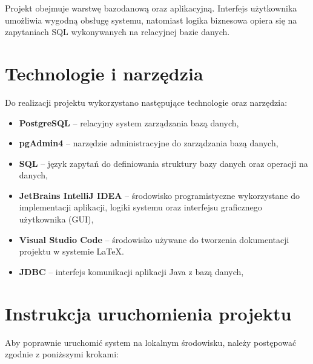 Projekt obejmuje warstwę bazodanową oraz aplikacyjną.
Interfejs użytkownika umożliwia wygodną obsługę systemu,
natomiast logika biznesowa opiera się na zapytaniach SQL
wykonywanych na relacyjnej bazie danych.


\section{Technologie i narzędzia}

Do realizacji projektu wykorzystano następujące technologie oraz narzędzia:
\begin{itemize}
    \item \textbf{PostgreSQL} – relacyjny system zarządzania bazą danych,
    \item \textbf{pgAdmin4} – narzędzie administracyjne do zarządzania bazą danych,
    \item \textbf{SQL} – język zapytań do definiowania struktury bazy danych
    oraz operacji na danych,
    \item \textbf{JetBrains IntelliJ IDEA} – środowisko programistyczne
    wykorzystane do implementacji aplikacji, logiki systemu oraz interfejsu
    graficznego użytkownika (GUI),
    \item \textbf{Visual Studio Code} – środowisko używane do tworzenia
    dokumentacji projektu w systemie \LaTeX.
    \item \textbf{JDBC} – interfejs komunikacji aplikacji Java z bazą danych,
\end{itemize}


\section{Instrukcja uruchomienia projektu}

Aby poprawnie uruchomić system na lokalnym środowisku, należy postępować
zgodnie z poniższymi krokami:

